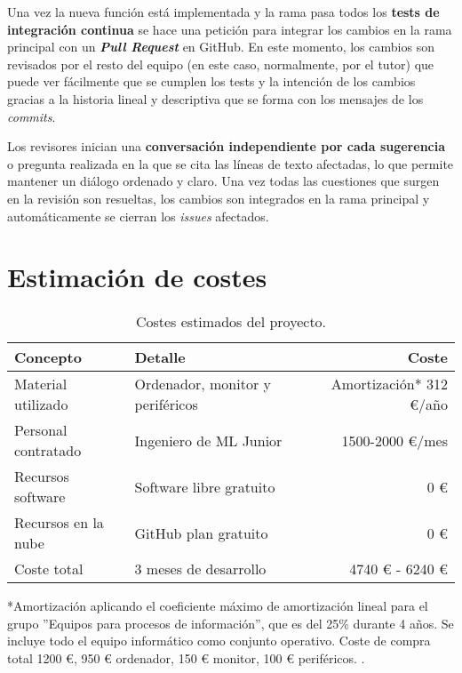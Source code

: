 Una vez la nueva función está implementada y la rama pasa todos los \textbf{tests de integración continua} se hace una petición para integrar los cambios en la rama principal con un \textbf{\textit{Pull Request}} en GitHub. En este momento, los cambios son revisados por el resto del equipo (en este caso, normalmente, por el tutor) que puede ver fácilmente que se cumplen los tests y la intención de los cambios gracias a la historia lineal y descriptiva que se forma con los mensajes de los \textit{commits}.

Los revisores inician una \textbf{conversación independiente por cada sugerencia} o pregunta realizada en la que se cita las líneas de texto afectadas, lo que permite mantener un diálogo ordenado y claro. Una vez todas las cuestiones que surgen en la revisión son resueltas, los cambios son integrados en la rama principal y automáticamente se cierran los \textit{issues} afectados.

\section{Estimación de costes}


\begin{table}[H]
	\centering
	\begin{tabular}{| l | l | r |}
    		\hline
        \textbf{Concepto} & \textbf{Detalle} & \textbf{Coste} \\
        \hline
        Material utilizado	& Ordenador, monitor y periféricos & Amortización* 312 €/año\\
        Personal contratado 	& Ingeniero de ML Junior	& 1500-2000 €/mes \\
        Recursos software 	& Software libre gratuito & 0 € \\
        Recursos en la nube 	& GitHub plan gratuito & 0 € \\
        \hline
        Coste total 			& 3 meses de desarrollo & 4740 € - 6240 € \\
        \hline
	\end{tabular}
	\caption{Costes estimados del proyecto.}
\end{table}

*Amortización aplicando el coeficiente máximo de amortización lineal para el grupo ''Equipos para procesos de información'', que es del 25\% durante 4 años. Se incluye todo el equipo informático como conjunto operativo. Coste de compra total 1200 €, 950 € ordenador, 150 € monitor, 100 € periféricos. \cite{lis}.